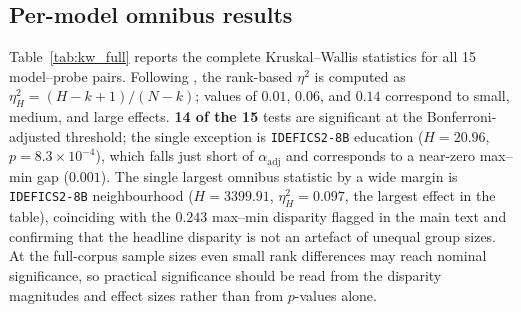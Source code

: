 \documentclass[letterpaper]{article} %
\newcommand{\model}[1]{\texttt{#1}}
\begin{document}
\subsection{Per-model omnibus results}
\label{app:stats_omnibus}

Table~\ref{tab:kw_full} reports the complete Kruskal--Wallis statistics for all 15 model--probe pairs. Following \citet{tomczak2014need}, the rank-based $\eta^2$ is computed as $\eta^2_H = (H - k + 1) / (N - k)$; values of $0.01$, $0.06$, and $0.14$ correspond to small, medium, and large effects. \textbf{14 of the 15} tests are significant at the Bonferroni-adjusted threshold; the single exception is \model{IDEFICS2-8B} education ($H = 20.96$, $p = 8.3\times10^{-4}$), which falls just short of $\alpha_{\text{adj}}$ and corresponds to a near-zero max--min gap ($0.001$). The single largest omnibus statistic by a wide margin is \model{IDEFICS2-8B} neighbourhood ($H = 3399.91$, $\eta^2_H = 0.097$, the largest effect in the table), coinciding with the $0.243$ max--min disparity flagged in the main text and confirming that the headline disparity is not an artefact of unequal group sizes. At the full-corpus sample sizes even small rank differences may reach nominal significance, so practical significance should be read from the disparity magnitudes and effect sizes rather than from $p$-values alone.
\end{document}
